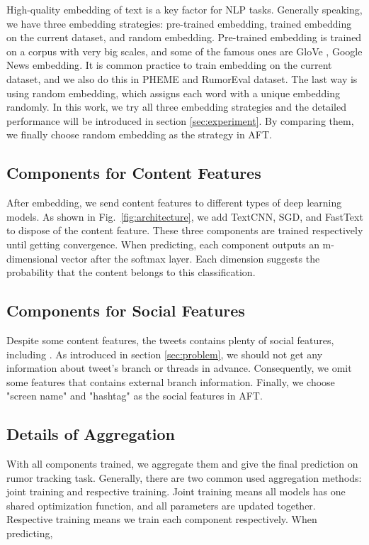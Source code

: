 High-quality embedding of text is a key factor for NLP tasks. Generally speaking, we have three embedding strategies: pre-trained embedding, trained embedding on the current dataset, and random embedding. Pre-trained embedding is trained on a corpus with very big scales, and some of the famous ones are GloVe \cite{pennington2014glove}, Google News embedding\cite{DBLP:journals/corr/abs-1301-3781}. It is common practice to train embedding on the current dataset, and we also do this in PHEME and RumorEval dataset. The last way is using random embedding, which assigns each word with a unique embedding randomly. In this work, we try all three embedding strategies and the detailed performance will be introduced in section \ref{sec:experiment}. By comparing them, we finally choose random embedding as the strategy in AFT.

\subsection{Components for Content Features}
After embedding, we send content features to different types of deep learning models. As shown in Fig.~\ref{fig:architecture}, we add TextCNN, SGD, and FastText to dispose of the content feature. These three components are trained respectively until getting convergence. When predicting, each component outputs an m-dimensional vector after the softmax layer. Each dimension suggests the probability that the content belongs to this classification.

\subsection{Components for Social Features}
Despite some content features, the tweets contains plenty of social features, including . As introduced in section \ref{sec:problem}, we should not get any information about tweet's branch or threads in advance. Consequently, we omit some features that contains external branch information. Finally, we choose "screen name" and "hashtag" as the social features in AFT. 

\subsection{Details of Aggregation}
With all components trained, we aggregate them and give the final prediction on rumor tracking task. Generally, there are two common used aggregation methods: joint training and respective training. Joint training means all models has one shared optimization function, and all parameters are updated together. Respective training means we train each component respectively. When predicting, 